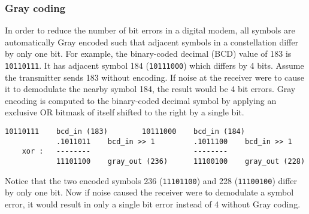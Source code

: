 \subsubsection{Gray coding}
\label{module:modem:digital:gray_coding}
In order to reduce the number of bit errors in a digital modem,
all symbols are automatically Gray encoded such that
adjacent symbols in a constellation differ by only one bit.
%
For example, the binary-coded decimal (BCD) value of 183 is {\tt 10110111}.
It has adjacent symbol 184 ({\tt 10111000}) which differs by 4 bits.
Assume the transmitter sends 183 without encoding.
If noise at the receiver were to cause it to demodulate the nearby
symbol 184, the result would be 4 bit errors.
%
Gray encoding is computed to the binary-coded decimal symbol
by applying an exclusive OR bitmask of itself shifted to the right by a
single bit.
%
\begin{Verbatim}[fontsize=\small]
            10110111    bcd_in (183)        10111000    bcd_in (184)
            .1011011    bcd_in >> 1         .1011100    bcd_in >> 1
    xor :   --------                        --------
            11101100    gray_out (236)      11100100    gray_out (228)
\end{Verbatim}
%
Notice that the two encoded symbols
236 ({\tt 11101100}) and
228 ({\tt 11100100}) differ by only one bit.
Now if noise caused the receiver were to demodulate a symbol error, it would
result in only a single bit error instead of 4 without Gray coding.

